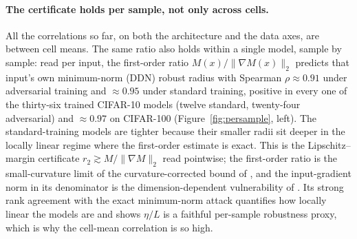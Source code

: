 \documentclass{article}
\theoremstyle{definition}
\begin{document}
\paragraph{The certificate holds per sample, not only across cells.} All the correlations so far, on both the architecture and the data axes, are between cell means. The same ratio also holds within a single model, sample by sample: read per input, the first-order ratio $M(x)/\|\nabla M(x)\|_2$ predicts that input's own minimum-norm (DDN) robust radius with Spearman $\rho\approx0.91$ under adversarial training and $\approx0.95$ under standard training, positive in every one of the thirty-six trained CIFAR-10 models (twelve standard, twenty-four adversarial) and $\approx0.97$ on CIFAR-100 (Figure~\ref{fig:persample}, left). The standard-training models are tighter because their smaller radii sit deeper in the locally linear regime where the first-order estimate is exact. This is the Lipschitz--margin certificate $r_2\gtrsim M/\|\nabla M\|_2$ \citep{hein2017formal,tsuzuku2018lipschitz} read pointwise; the first-order ratio is the small-curvature limit of the curvature-corrected bound of \citet{moosavi2019robustness}, and the input-gradient norm in its denominator is the dimension-dependent vulnerability of \citet{simongabriel2019first}. Its strong rank agreement with the exact minimum-norm attack quantifies how locally linear the models are and shows $\eta/L$ is a faithful per-sample robustness proxy, which is why the cell-mean correlation is so high.
\end{document}
